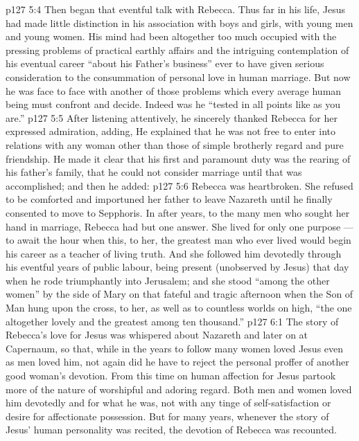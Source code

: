 \vs p127 5:4 Then began that eventful talk with Rebecca. Thus far in his life, Jesus had made little distinction in his association with boys and girls, with young men and young women. His mind had been altogether too much occupied with the pressing problems of practical earthly affairs and the intriguing contemplation of his eventual career “about his Father’s business” ever to have given serious consideration to the consummation of personal love in human marriage. But now he was face to face with another of those problems which every average human being must confront and decide. Indeed was he “tested in all points like as you are.”
\vs p127 5:5 After listening attentively, he sincerely thanked Rebecca for her expressed admiration, adding,  He explained that he was not free to enter into relations with any woman other than those of simple brotherly regard and pure friendship. He made it clear that his first and paramount duty was the rearing of his father’s family, that he could not consider marriage until that was accomplished; and then he added: 
\vs p127 5:6 Rebecca was heartbroken. She refused to be comforted and importuned her father to leave Nazareth until he finally consented to move to Sepphoris. In after years, to the many men who sought her hand in marriage, Rebecca had but one answer. She lived for only one purpose --- to await the hour when this, to her, the greatest man who ever lived would begin his career as a teacher of living truth. And she followed him devotedly through his eventful years of public labour, being present (unobserved by Jesus) that day when he rode triumphantly into Jerusalem; and she stood “among the other women” by the side of Mary on that fateful and tragic afternoon when the Son of Man hung upon the cross, to her, as well as to countless worlds on high, “the one altogether lovely and the greatest among ten thousand.”
\vs p127 6:1 The story of Rebecca’s love for Jesus was whispered about Nazareth and later on at Capernaum, so that, while in the years to follow many women loved Jesus even as men loved him, not again did he have to reject the personal proffer of another good woman’s devotion. From this time on human affection for Jesus partook more of the nature of worshipful and adoring regard. Both men and women loved him devotedly and for what he was, not with any tinge of self\hyp{}satisfaction or desire for affectionate possession. But for many years, whenever the story of Jesus’ human personality was recited, the devotion of Rebecca was recounted.
